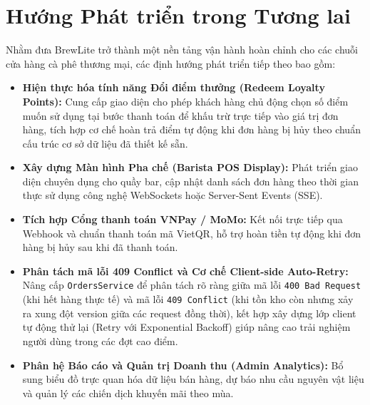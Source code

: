 \section{Hướng Phát triển trong Tương lai}
Nhằm đưa BrewLite trở thành một nền tảng vận hành hoàn chỉnh cho các chuỗi cửa hàng cà phê thương mại, các định hướng phát triển tiếp theo bao gồm:
\begin{itemize}
    \item \textbf{Hiện thực hóa tính năng Đổi điểm thưởng (Redeem Loyalty Points):} Cung cấp giao diện cho phép khách hàng chủ động chọn số điểm muốn sử dụng tại bước thanh toán để khấu trừ trực tiếp vào giá trị đơn hàng, tích hợp cơ chế hoàn trả điểm tự động khi đơn hàng bị hủy theo chuẩn cấu trúc cơ sở dữ liệu đã thiết kế sẵn.
    \item \textbf{Xây dựng Màn hình Pha chế (Barista POS Display):} Phát triển giao diện chuyên dụng cho quầy bar, cập nhật danh sách đơn hàng theo thời gian thực sử dụng công nghệ WebSockets hoặc Server-Sent Events (SSE).
    \item \textbf{Tích hợp Cổng thanh toán VNPay / MoMo:} Kết nối trực tiếp qua Webhook và chuẩn thanh toán mã VietQR, hỗ trợ hoàn tiền tự động khi đơn hàng bị hủy sau khi đã thanh toán.
    \item \textbf{Phân tách mã lỗi 409 Conflict và Cơ chế Client-side Auto-Retry:} Nâng cấp \texttt{OrdersService} để phân tách rõ ràng giữa mã lỗi \texttt{400 Bad Request} (khi hết hàng thực tế) và mã lỗi \texttt{409 Conflict} (khi tồn kho còn nhưng xảy ra xung đột version giữa các request đồng thời), kết hợp xây dựng lớp client tự động thử lại (Retry với Exponential Backoff) giúp nâng cao trải nghiệm người dùng trong các đợt cao điểm.
    \item \textbf{Phân hệ Báo cáo và Quản trị Doanh thu (Admin Analytics):} Bổ sung biểu đồ trực quan hóa dữ liệu bán hàng, dự báo nhu cầu nguyên vật liệu và quản lý các chiến dịch khuyến mãi theo mùa.
\end{itemize}
